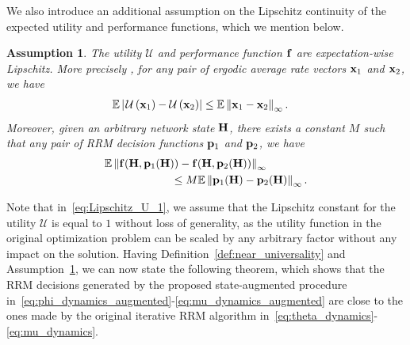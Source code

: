 \documentclass[lettersize,journal]{IEEEtran}
\newtheorem{assumption}{\hspace{0pt}\bf Assumption}
\def\E{\mathbb{E}}
\begin{document}
We also introduce an additional assumption on the Lipschitz continuity of the expected utility and performance functions, which we mention below.
\begin{assumption}\label{assumption:Lipschitz}
The utility $\mathcal{U}$ and performance function ${\mathbf f}$ are expectation-wise Lipschitz. More precisely%
, for any pair of ergodic average rate vectors ${\mathbf x}_1$ and ${\mathbf x}_2$, %
we have
\begin{align}\label{eq:Lipschitz_U_1}
& \E \left| \hspace{1pt} \mathcal{U}\left( \bbx_1 \right) - \mathcal{U}\left( \bbx_2 \right) \right| \leq \E \left\| \bbx_1 - \bbx_2\right\|_{\infty}.
\end{align}
Moreover, given an arbitrary network state ${\mathbf H}$, there exists a constant $M$ such that any pair of RRM decision functions ${\mathbf p}_1$ and ${\mathbf p}_2$, we have
\begin{align}
& \E \left\| \bbf(\bbH, \bbp_1(\bbH)) - \bbf(\bbH, \bbp_2(\bbH)) \right\|_{\infty} \nonumber \\
& \qquad\qquad\qquad\leq M \E \left\| \bbp_1(\bbH) - \bbp_2(\bbH) \right\|_{\infty}.
\end{align}
\end{assumption}

Note that in~\eqref{eq:Lipschitz_U_1}, we assume that the Lipschitz constant for the utility $\mathcal{U}$ is equal to $1$ without loss of generality, as the utility function in the original optimization problem can be scaled by any arbitrary factor without any impact on the solution. Having Definition~\ref{def:near_universality} and Assumption~\ref{assumption:Lipschitz}, we can now state the following theorem, which shows that the RRM decisions generated by the proposed state-augmented procedure in~\eqref{eq:phi_dynamics_augmented}-\eqref{eq:mu_dynamics_augmented} are close to the ones made by the original iterative RRM algorithm in~\eqref{eq:theta_dynamics}-\eqref{eq:mu_dynamics}.
\end{document}
